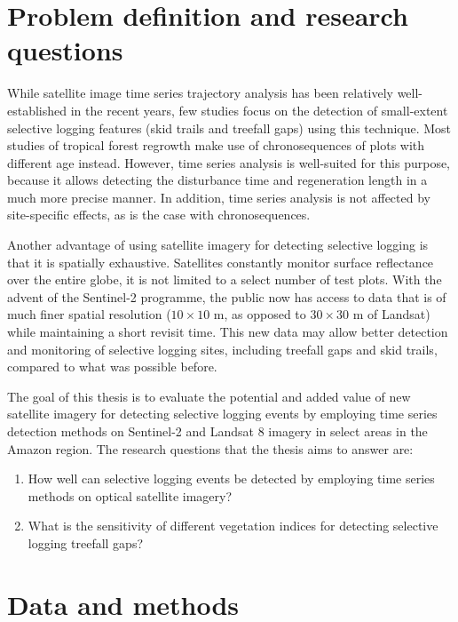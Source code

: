 \documentclass[a4paper,12pt]{scrbook}
\begin{document}
\chapter{Problem definition and research questions}

While satellite image time series trajectory analysis has been relatively well-established in the recent years, few studies focus on the detection of small-extent selective logging features (skid trails and treefall gaps) using this technique. Most studies of tropical forest regrowth make use of chronosequences of plots with different age instead. However, time series analysis is well-suited for this purpose, because it allows detecting the disturbance time and regeneration length in a much more precise manner. In addition, time series analysis is not affected by site-specific effects, as is the case with chronosequences.

Another advantage of using satellite imagery for detecting selective logging is that it is spatially exhaustive. Satellites constantly monitor surface reflectance over the entire globe, it is not limited to a select number of test plots. With the advent of the Sentinel-2 programme, the public now has access to data that is of much finer spatial resolution ($10\times10$ m, as opposed to $30\times30$ m of Landsat) while maintaining a short revisit time. This new data may allow better detection and monitoring of selective logging sites, including treefall gaps and skid trails, compared to what was possible before.

The goal of this thesis is to evaluate the potential and added value of new satellite imagery for detecting selective logging events by employing time series detection methods on Sentinel-2 and Landsat 8 imagery in select areas in the Amazon region. The research questions that the thesis aims to answer are:

\begin{enumerate}
 \item How well can selective logging events be detected by employing time series methods on optical satellite imagery?
 \item What is the sensitivity of different vegetation indices for detecting selective logging treefall gaps?
\end{enumerate}

\chapter{Data and methods}
\end{document}
